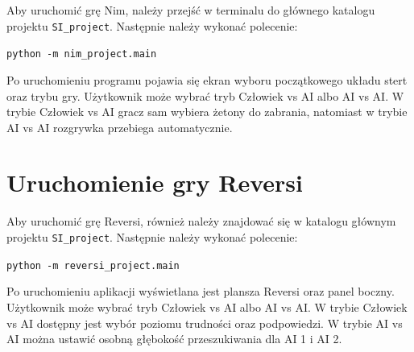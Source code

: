 Aby uruchomić grę Nim, należy przejść w terminalu do głównego katalogu projektu \texttt{SI\_project}. Następnie należy wykonać polecenie:

\begin{center}
\texttt{python -m nim\_project.main}
\end{center}

Po uruchomieniu programu pojawia się ekran wyboru początkowego układu stert oraz trybu gry. Użytkownik może wybrać tryb Człowiek vs AI albo AI vs AI. W trybie Człowiek vs AI gracz sam wybiera żetony do zabrania, natomiast w trybie AI vs AI rozgrywka przebiega automatycznie.

\section{Uruchomienie gry Reversi}

Aby uruchomić grę Reversi, również należy znajdować się w katalogu głównym projektu \texttt{SI\_project}. Następnie należy wykonać polecenie:

\begin{center}
\texttt{python -m reversi\_project.main}
\end{center}

Po uruchomieniu aplikacji wyświetlana jest plansza Reversi oraz panel boczny. Użytkownik może wybrać tryb Człowiek vs AI albo AI vs AI. W trybie Człowiek vs AI dostępny jest wybór poziomu trudności oraz podpowiedzi. W trybie AI vs AI można ustawić osobną głębokość przeszukiwania dla AI 1 i AI 2.